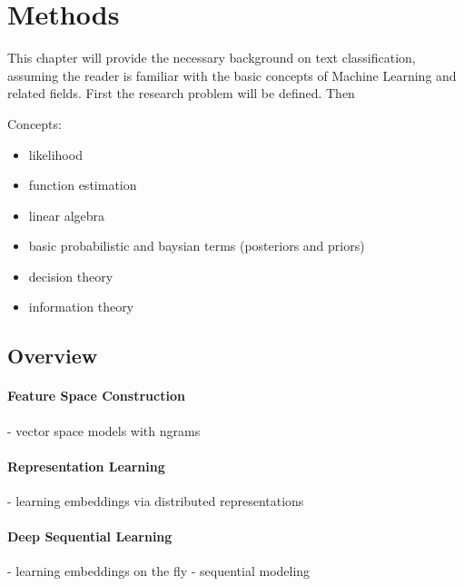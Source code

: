 
\clearpage

\section{Methods}
\label{sec:Methods}

This chapter will provide the necessary background on text classification, assuming the reader is familiar with the basic concepts of Machine Learning and related fields. First the research problem will be defined. Then

Concepts:
\begin{itemize}
  \item likelihood
  \item function estimation
  \item linear algebra
  \item basic probabilistic and baysian terms (posteriors and priors)
  \item decision theory
  \item information theory
\end{itemize}

\subsection{Overview}
\label{sub:Overview}

\paragraph{Feature Space Construction}
\label{par:Space Construction Pipeline}

- vector space models with ngrams

\paragraph{Representation Learning}
\label{par:Representation Learning for Feature Spaces}

- learning embeddings via distributed representations

\paragraph{Deep Sequential Learning}
\label{par:Deep Sequential Learning}

- learning embeddings on the fly
- sequential modeling




